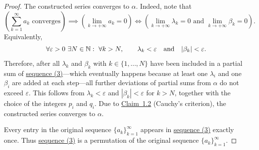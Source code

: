 \begin{proof}
The constructed series converges to $\alpha$. Indeed, note that
\[
\left(\sum_{k=1}^{\infty}a_k\text{ converges}\right)
\implies
\left(\lim_{k\to+\infty}a_k=0\right)
\iff
\left(
\lim_{k\to+\infty}\lambda_k=0
\text{ and }
\lim_{k\to+\infty}\beta_k=0
\right).
\]
Equivalently,
\[
\forall\varepsilon>0\ \exists N\in\mathbb{N}:\ \forall k>N,
\qquad
\lambda_k<\varepsilon
\quad\text{and}\quad
|\beta_k|<\varepsilon.
\]
Therefore, after all $\lambda_k$ and $\beta_k$ with $k\in\{1,\ldots,N\}$ have been included in a partial sum of \hyperref[eq:3:3:1]{sequence (3)}---which eventually happens because at least one $\lambda_i$ and one $\beta_i$ are added at each step---all further deviations of partial sums from $\alpha$ do not exceed $\varepsilon$. This follows from $\lambda_k<\varepsilon$ and $|\beta_k|<\varepsilon$ for $k>N$, together with the choice of the integers $p_i$ and $q_i$. Due to \hyperref[claim:1.2]{Claim~1.2} (Cauchy's criterion), the constructed series converges to $\alpha$.

Every entry in the original sequence $\{a_k\}_{k=1}^{\infty}$ appears in \hyperref[eq:3:3:1]{sequence (3)} exactly once. Thus \hyperref[eq:3:3:1]{sequence (3)} is a permutation of the original sequence $\{a_k\}_{k=1}^{\infty}$.
\end{proof}
